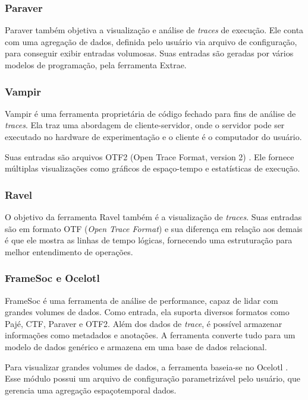 \subsubsection{Paraver}
Paraver \cite{ref:paraver} também objetiva a visualização e análise de 
\emph{traces} de execução. Ele conta com uma agregação de dados, definida pelo
usuário via arquivo de configuração, para conseguir exibir entradas volumosas. 
Suas entradas são geradas por vários modelos de programação, pela ferramenta 
Extrae.

\subsubsection{Vampir}
Vampir \cite{ref:vampir} é uma ferramenta proprietária de código fechado para 
fins de análise de \emph{traces}. Ela traz uma abordagem de cliente-servidor, 
onde o servidor pode ser executado no hardware de experimentação e o cliente é o 
computador do usuário.

Suas entradas são arquivos OTF2 (Open Trace Format, version 2) \cite{ref:otf2}.  
Ele fornece múltiplas visualizações como gráficos de espaço-tempo e estatísticas 
de execução.

\subsubsection{Ravel}
O objetivo da ferramenta Ravel \cite{ref:ravel} também é a visualização de 
\emph{traces}. Suas entradas são em formato OTF (\emph{Open Trace Format}) e 
sua diferença em relação aos demais é que ele mostra as linhas de tempo 
lógicas, fornecendo uma estruturação para melhor entendimento de operações.

\subsubsection{FrameSoc e Ocelotl}

FrameSoc \cite{ref:framesoc} é uma ferramenta de análise de performance, capaz 
de lidar com grandes volumes de dados. Como entrada, ela suporta diversos
formatos como Pajé, CTF, Paraver e OTF2. Além dos dados de \emph{trace}, é 
possível armazenar informações como metadados e anotações. A ferramenta converte 
tudo para um modelo de dados genérico e armazena em uma base de dados 
relacional.

Para visualizar grandes volumes de dados, a ferramenta baseia-se no Ocelotl 
\cite{ref:ocelotl}. Esse módulo possui um arquivo de configuração parametrizável 
pelo usuário, que gerencia uma agregação espaçotemporal dados.

